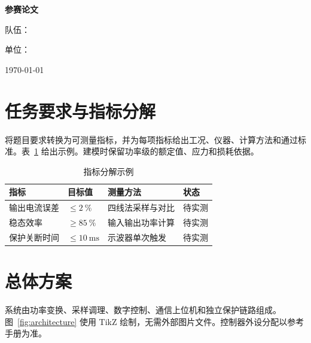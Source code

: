 \documentclass[12pt,fontset=fandol]{ctexart}
\begin{document}
\begin{titlepage}
  \centering
  {\bfseries \Competition{}参赛论文\par}
  \vspace{2.2cm}
  {\bfseries \ProjectTitle\par}
  \vspace{1.5cm}
  {队伍：\TeamName\par}
  {单位：\University\par}
  \vfill
  {\today\par}
\end{titlepage}

\begin{abstract}
本文给出一套面向低压、隔离实验平台的能量回馈变流器控制系统设计示例。论文结构覆盖需求拆解、总体方案、硬件与软件设计、控制算法、保护策略、测试方法、结果分析和成本评估。示例数据仅用于演示排版，参赛时必须替换为真实测量结果。

\textbf{关键词：}能量回馈；变流器；嵌入式控制；故障保护；实验验证
\end{abstract}

\tableofcontents
\newpage

\section{任务要求与指标分解}
将题目要求转换为可测量指标，并为每项指标给出工况、仪器、计算方法和通过标准。表~\ref{tab:requirements} 给出示例。建模时保留功率级的额定值、应力和损耗依据\cite{erickson2020fpe}。

\begin{table}[htbp]
  \centering
  \caption{指标分解示例}\label{tab:requirements}
  \begin{tabular}{llll}
    \toprule
    指标 & 目标值 & 测量方法 & 状态 \\
    \midrule
    输出电流误差 & $\leq\qty{2}{\percent}$ & 四线法采样与对比 & 待实测 \\
    稳态效率 & $\geq\qty{85}{\percent}$ & 输入输出功率计算 & 待实测 \\
    保护关断时间 & $\leq\qty{10}{\milli\second}$ & 示波器单次触发 & 待实测 \\
    \bottomrule
  \end{tabular}
\end{table}

\section{总体方案}
系统由功率变换、采样调理、数字控制、通信上位机和独立保护链路组成。图~\ref{fig:architecture} 使用 TikZ 绘制，无需外部图片文件。控制器外设分配以参考手册为准\cite{stm32f103rm}。
\end{document}
